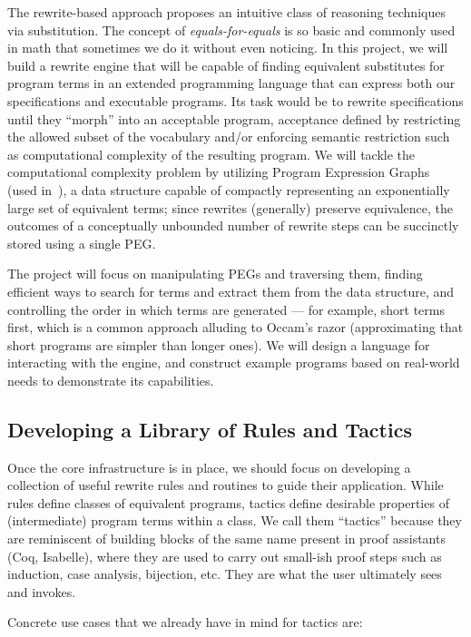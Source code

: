 The rewrite-based approach proposes an intuitive class of reasoning techniques
via substitution.
The concept of \emph{equals-for-equals} is so basic and commonly used in math
that sometimes we do it without even noticing.
In this project, we will build a rewrite engine that will be
capable of finding equivalent substitutes for program terms in an extended programming language that
can express both our specifications and executable programs.
Its task would be to rewrite specifications until they ``morph'' into an
acceptable program, acceptance defined by restricting the allowed subset of the
vocabulary and/or enforcing semantic restriction such as computational complexity
of the resulting program.
We will tackle the computational complexity problem by utilizing Program
Expression Graphs~\cite{POPL2009/Tate} (used \eg in~\cite{PLDI2015/Panchekha}),
a data structure capable of compactly representing an exponentially large
set of equivalent terms;
since rewrites (generally) preserve equivalence,
the outcomes of a conceptually unbounded number of rewrite steps
can be succinctly stored using a single PEG.

The project will focus on manipulating PEGs and traversing them, finding
efficient ways to search for terms and extract them from the data structure,
and controlling the order in which terms are generated --- for example,
short terms first, which is a common approach alluding to Occam's razor
(approximating that short programs are simpler than longer ones).
We will design a language for interacting with the engine, and construct 
example programs based on real-world needs to demonstrate its capabilities.


\subsection{Developing a Library of Rules and Tactics}

Once the core infrastructure is in place, we should focus on developing
a collection of useful rewrite rules and routines to guide their application.
While rules define classes of equivalent programs, tactics define desirable
properties of (intermediate) program terms within a class.
We call them ``tactics'' because they are reminiscent of building
blocks of the same name present in proof
assistants (Coq, Isabelle), where they are used to carry out
small-ish proof steps such as induction, case analysis, bijection, etc.
They are what the user ultimately sees and invokes.

Concrete use cases that we already have in mind for tactics are:

